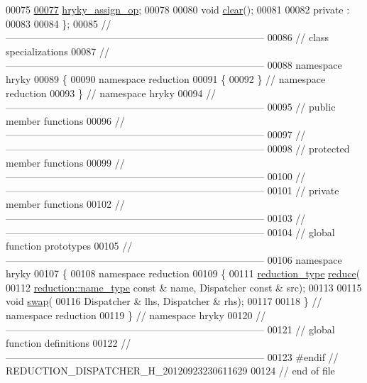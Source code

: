 \begin{DoxyCode}
00075 
\hypertarget{reduction__dispatcher_8h_source_l00077}{}\hyperlink{classhryky_1_1reduction_1_1_dispatcher_a476bd9236d0f139f1d910f3136c338f1}{00077}     \hyperlink{classhryky_1_1reduction_1_1_dispatcher_a476bd9236d0f139f1d910f3136c338f1}{hryky_assign_op};
00078 
00080     \textcolor{keywordtype}{void} \hyperlink{classhryky_1_1reduction_1_1_dispatcher_a213555cff0e556163c353f138156891b}{clear}();
00081 
00082 \textcolor{keyword}{private} :
00083 
00084 \};
00085 \textcolor{comment}{//
      ------------------------------------------------------------------------------}
00086 \textcolor{comment}{// class specializations}
00087 \textcolor{comment}{//
      ------------------------------------------------------------------------------}
00088 \textcolor{keyword}{namespace }hryky
00089 \{
00090 \textcolor{keyword}{namespace }reduction
00091 \{
00092 \} \textcolor{comment}{// namespace reduction}
00093 \} \textcolor{comment}{// namespace hryky}
00094 \textcolor{comment}{//
      ------------------------------------------------------------------------------}
00095 \textcolor{comment}{// public member functions}
00096 \textcolor{comment}{//
      ------------------------------------------------------------------------------}
00097 \textcolor{comment}{//
      ------------------------------------------------------------------------------}
00098 \textcolor{comment}{// protected member functions}
00099 \textcolor{comment}{//
      ------------------------------------------------------------------------------}
00100 \textcolor{comment}{//
      ------------------------------------------------------------------------------}
00101 \textcolor{comment}{// private member functions}
00102 \textcolor{comment}{//
      ------------------------------------------------------------------------------}
00103 \textcolor{comment}{//
      ------------------------------------------------------------------------------}
00104 \textcolor{comment}{// global function prototypes}
00105 \textcolor{comment}{//
      ------------------------------------------------------------------------------}
00106 \textcolor{keyword}{namespace }hryky
00107 \{
00108 \textcolor{keyword}{namespace }reduction
00109 \{
00111     \hyperlink{namespacehryky_a343a9a4c36a586be5c2693156200eadc}{reduction_type} \hyperlink{namespacehryky_1_1reduction_a064022926c530d18aeb1b2abdf71800b}{reduce}(
00112         \hyperlink{namespacehryky_1_1reduction_ac686c30a4c8d196bbd0f05629a6b921f}{reduction::name_type} \textcolor{keyword}{const} & name, Dispatcher \textcolor{keyword}{const} & src);
00113 
00115     \textcolor{keywordtype}{void} \hyperlink{namespacehryky_1_1reduction_a493c83efdf5f9e9c49ba77e1b65325a1}{swap}(
00116         Dispatcher & lhs, Dispatcher & rhs);
00117 
00118 \} \textcolor{comment}{// namespace reduction}
00119 \} \textcolor{comment}{// namespace hryky}
00120 \textcolor{comment}{//
      ------------------------------------------------------------------------------}
00121 \textcolor{comment}{// global function definitions}
00122 \textcolor{comment}{//
      ------------------------------------------------------------------------------}
00123 \textcolor{preprocessor}{#endif // REDUCTION\_DISPATCHER\_H\_20120923230611629}
00124 \textcolor{preprocessor}{}\textcolor{comment}{// end of file}
\end{DoxyCode}
